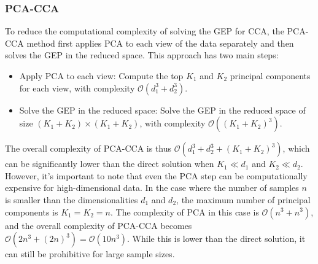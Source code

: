 \subsubsection{PCA-CCA}
To reduce the computational complexity of solving the GEP for CCA, the PCA-CCA method first applies PCA to each view of the data separately and then solves the GEP in the reduced space. This approach has two main steps:

\begin{itemize}
    \item Apply PCA to each view: Compute the top $K_1$ and $K_2$ principal components for each view, with complexity $\mathcal{O}(d_1^3 + d_2^3)$.
    \item Solve the GEP in the reduced space: Solve the GEP in the reduced space of size $(K_1 + K_2) \times (K_1 + K_2)$, with complexity $\mathcal{O}((K_1 + K_2)^3)$.
\end{itemize}

The overall complexity of PCA-CCA is thus $\mathcal{O}(d_1^3 + d_2^3 + (K_1 + K_2)^3)$, which can be significantly lower than the direct solution when $K_1 \ll d_1$ and $K_2 \ll d_2$.
However, it's important to note that even the PCA step can be computationally expensive for high-dimensional data. In the case where the number of samples $n$ is smaller than the dimensionalities $d_1$ and $d_2$, the maximum number of principal components is $K_1 = K_2 = n$. The complexity of PCA in this case is $\mathcal{O}(n^3 + n^3)$, and the overall complexity of PCA-CCA becomes $\mathcal{O}(2n^3 + (2n)^3) = \mathcal{O}(10n^3)$. While this is lower than the direct solution, it can still be prohibitive for large sample sizes.
